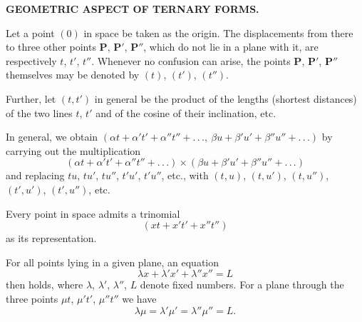 
\begin{center}
\large\bfseries GEOMETRIC ASPECT OF TERNARY FORMS.
\end{center}



Let a point $(0)$ in space be taken as the origin. The displacements from there to three
other points $\boldsymbol{P}$, $\boldsymbol{P}'$, $\boldsymbol{P}''$, which do not lie
in a plane with it, are respectively $t$, $t'$, $t''$. Whenever no confusion can arise,
the points $\boldsymbol{P}$, $\boldsymbol{P}'$, $\boldsymbol{P}''$ themselves may be denoted by $(t)$,
$(t')$, $(t'')$.

Further, let $(t,t')$ in general be the product of the lengths (shortest distances) of the two
lines $t$, $t'$ and of the cosine of their inclination, etc.

In general, we obtain $(\alpha t + \alpha' t' + \alpha'' t'' + .\,.\,.,\ \beta u + \beta' u' +
\beta'' u'' + .\,.\,.)$ by carrying out the multiplication
\[
(\alpha t + \alpha' t' + \alpha'' t'' + .\,.\,.) \times (\beta u + \beta' u' + \beta'' u'' + .\,.\,.)
\]
and replacing $tu$, $tu'$, $tu''$, $t'u'$, $t'u''$, etc., with $(t,u)$, $(t,u')$,
$(t,u'')$, $(t',u')$, $(t',u'')$, etc.

Every point in space admits a trinomial
\[
(xt + x't' + x''t'')
\]
as its representation.

For all points lying in a given plane, an equation
\[
\lambda x + \lambda' x' + \lambda'' x'' = L
\]
then holds, where $\lambda$, $\lambda'$, $\lambda''$, $L$ denote fixed numbers. For a
plane through the three points $\mu t$, $\mu' t'$, $\mu'' t''$ we have
\[
\lambda\mu = \lambda'\mu' = \lambda''\mu'' = L.
\]
